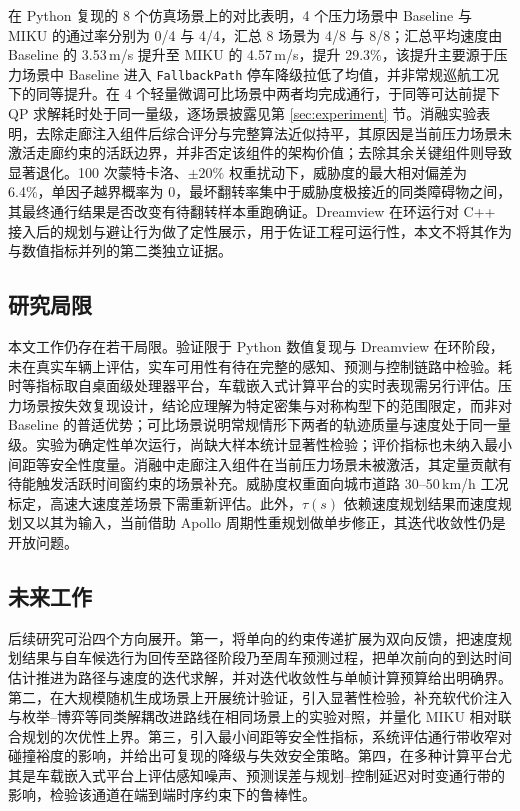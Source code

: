 \documentclass[a4paper,11pt]{ctexart}
\theoremstyle{definition}
\begin{document}
在 Python 复现的 8 个仿真场景上的对比表明，4 个压力场景中 Baseline 与 MIKU 的通过率分别为 0/4 与 4/4，汇总 8 场景为 4/8 与 8/8；汇总平均速度由 Baseline 的 3.53\,m/s 提升至 MIKU 的 4.57\,m/s，提升 29.3\%，该提升主要源于压力场景中 Baseline 进入 \texttt{FallbackPath} 停车降级拉低了均值，并非常规巡航工况下的同等提升。在 4 个轻量微调可比场景中两者均完成通行，于同等可达前提下 QP 求解耗时处于同一量级，逐场景披露见第 \ref{sec:experiment} 节。消融实验表明，去除走廊注入组件后综合评分与完整算法近似持平，其原因是当前压力场景未激活走廊约束的活跃边界，并非否定该组件的架构价值；去除其余关键组件则导致显著退化。100 次蒙特卡洛、$\pm20\%$ 权重扰动下，威胁度的最大相对偏差为 6.4\%，单因子越界概率为 0，最坏翻转率集中于威胁度极接近的同类障碍物之间，其最终通行结果是否改变有待翻转样本重跑确证。Dreamview 在环运行对 C++ 接入后的规划与避让行为做了定性展示，用于佐证工程可运行性，本文不将其作为与数值指标并列的第二类独立证据。

\subsection{研究局限}

本文工作仍存在若干局限。验证限于 Python 数值复现与 Dreamview 在环阶段，未在真实车辆上评估，实车可用性有待在完整的感知、预测与控制链路中检验。耗时等指标取自桌面级处理器平台，车载嵌入式计算平台的实时表现需另行评估。压力场景按失效复现设计，结论应理解为特定密集与对称构型下的范围限定，而非对 Baseline 的普适优势；可比场景说明常规情形下两者的轨迹质量与速度处于同一量级。实验为确定性单次运行，尚缺大样本统计显著性检验；评价指标也未纳入最小间距等安全性度量。消融中走廊注入组件在当前压力场景未被激活，其定量贡献有待能触发活跃时间窗约束的场景补充。威胁度权重面向城市道路 30--50\,km/h 工况标定，高速大速度差场景下需重新评估。此外，$\tau(s)$ 依赖速度规划结果而速度规划又以其为输入，当前借助 Apollo 周期性重规划做单步修正，其迭代收敛性仍是开放问题。

\subsection{未来工作}

后续研究可沿四个方向展开。第一，将单向的约束传递扩展为双向反馈，把速度规划结果与自车候选行为回传至路径阶段乃至周车预测过程，把单次前向的到达时间估计推进为路径与速度的迭代求解，并对迭代收敛性与单帧计算预算给出明确界。第二，在大规模随机生成场景上开展统计验证，引入显著性检验，补充软代价注入与枚举--博弈等同类解耦改进路线在相同场景上的实验对照，并量化 MIKU 相对联合规划的次优性上界。第三，引入最小间距等安全性指标，系统评估通行带收窄对碰撞裕度的影响，并给出可复现的降级与失效安全策略。第四，在多种计算平台尤其是车载嵌入式平台上评估感知噪声、预测误差与规划--控制延迟对时变通行带的影响，检验该通道在端到端时序约束下的鲁棒性。


\printbibliography[heading=bibintoc,title={参考文献}]
\end{document}
